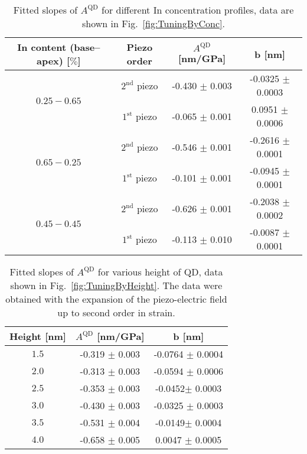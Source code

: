  		\begin{table}[ht!]
 			\centering
 			\caption{Fitted slopes of $A^{\mathrm{QD}}$ for different In concentration profiles, data are shown in Fig.~\ref{fig:TuningByConc}.}
 				\label{tab:conc_slopes}
 				\begin{tabular}{|c|c|c|c|}
 					\hline
 		In content (base--apex)	[$\%$]	& Piezo order	& $A^{\mathrm{QD}}$ [nm/GPa]    & b   [nm]    \\ \hline
 					\multirow{2}{*}{$0.25-0.65$} & $2^\mathrm{nd}$ piezo &-0.430 $\pm$ 0.003  & -0.0325 $\pm$ 0.0003      \\ \cline{2-4}
 			&	$1^\mathrm{st}$ piezo 	& -0.065 $\pm$ 0.001  & 0.0951 $\pm$ 0.0006      \\ \hline
 			\multirow{2}{*}{$0.65-0.25$} & $2^\mathrm{nd}$ piezo &-0.546 $\pm$ 0.001  & -0.2616 $\pm$ 0.0001      \\ \cline{2-4}
 			&	$1^\mathrm{st}$ piezo 	& -0.101 $\pm$ 0.001  & -0.0945 $\pm$ 0.0001      \\ \hline
 			\multirow{2}{*}{$0.45-0.45$} & $2^\mathrm{nd}$ piezo &-0.626 $\pm$ 0.001  & -0.2038 $\pm$ 0.0002      \\ \cline{2-4}
 			&	$1^\mathrm{st}$ piezo 	& -0.113 $\pm$ 0.010  & -0.0087 $\pm$ 0.0001      \\ \hline
 				\end{tabular}    
 			\end{table}
 			

 		\begin{table}[ht!]
 			\centering
 			\caption{Fitted slopes of $A^{\mathrm{QD}}$ for various height of QD, data shown in Fig.~\ref{fig:TuningByHeight}. The data were obtained with the expansion of the piezo-electric field up to second order in strain.}
 			\label{tab:height_slopes}
 			\begin{tabular}{|c|c|c|}
 				\hline
 				Height [nm]		& $A^{\mathrm{QD}}$ [nm/GPa]    & b   [nm]    \\ \hline
 			 $1.5$  &-0.319 $\pm$ 0.003  & -0.0764 $\pm$ 0.0004     \\ \hline
 			$2.0$	&-0.313 $\pm$ 0.003  & -0.0594 $\pm$ 0.0006      \\ \hline
 			 $2.5$  &-0.353 $\pm$ 0.003  & -0.0452$\pm$ 0.0003     \\ \hline
 			 $3.0$	&-0.430 $\pm$ 0.003  & -0.0325 $\pm$ 0.0003      \\ \hline
 			 $3.5$  &-0.531 $\pm$ 0.004  & -0.0149$\pm$ 0.0004     \\ \hline
 			 $4.0$	&-0.658 $\pm$ 0.005  & 0.0047 $\pm$ 0.0005      \\ \hline
 			\end{tabular}    
 		\end{table}
 		

